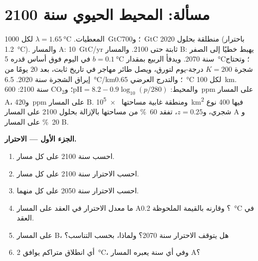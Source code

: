 \section{مسألة: المحيط الحيوي سنة 2100}

\begin{problem}
\label{pb:b2:global-change:1}
المعطيات. $\lambda = \qty{1.65}{\celsius}$ لكل \qty{1000}{GtC}؛
و\qty{700}{GtC} منطلقة بحلول 2020 (باحترار \qty{1.2}{\celsius}). والمسار
A: \qty{10}{GtC/yr} ثابتة حتى 2100. والمسار B: يهبط خطيًا إلى
الصفر سنة 2070. ويدفأ الربيع بمقدار $b = \qty{0.1}{\celsius}$ في اليوم
فوق أساس قدره \qty{5}{\celsius}؛ وتحتاج شجرة $K = 200$
درجة-يوم لتورق، ويصل طائر مهاجر في تاريخ ثابت،
بعد 20 يومًا من إيراق الشجرة سنة 2020. 
\qty{6.5}{\celsius/km}؛ والتدرج العرضي \qty{0.65}{\celsius}
لكل \qty{100}{km}. والمحيط: $\mathrm{pH} = 8.2 - 0.9\log_{10}(p/280)$؛
و\ensuremath{\mathrm{CO_2}} سنة 2100: \qty{600}{ppm} على المسار A، و\qty{420}{ppm} على المسار B.
ومنطقة غابية مساحتها \qty{e5}{km^2} فيها 400 نوع شجري، و$z = 0.25$،
تفقد \qty{60}{\%} من مساحتها بالإزالة بحلول 2100 على المسار A و
\qty{20}{\%} على المسار B.

\medskip
\noindent\textbf{الجزء الأول --- الاحترار.}
\begin{enumerate}
  \item احسب  سنة 2100 على كل مسار.
  \item احسب الاحترار سنة 2100 على كل مسار.
  \item احسب الاحترار سنة 2050 على كل منهما.
  \item ما معدل الاحترار في العقد على المسار A؟ وقارنه
        بالقيمة الملحوظة \qty{0.2}{\celsius} في العقد.
  \item على المسار B، هل يتوقف الاحترار سنة 2070؟ ولماذا، بحسب
        التناسب؟
  \item أي انطلاق متراكم يوافق \qty{2}{\celsius}،
        وفي أي سنة يعبره المسار A؟
\end{enumerate}


\end{problem}
